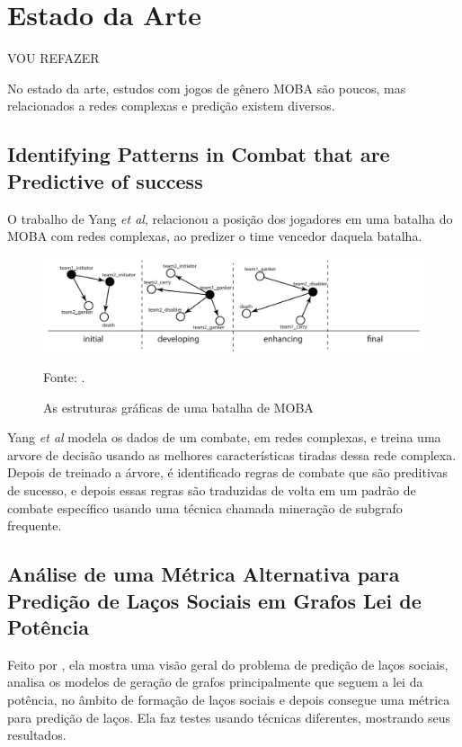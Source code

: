 \section{Estado da Arte}


{\Huge VOU REFAZER}


No estado da arte, estudos com jogos de gênero MOBA são poucos, mas relacionados a redes complexas e predição existem diversos.

\subsection{Identifying Patterns in Combat that are Predictive of success}
 O trabalho de Yang \textit{et al}, relacionou a posição dos jogadores em uma batalha do MOBA com redes complexas, ao predizer o time vencedor daquela batalha.

\begin{figure}[!ht]
	\caption{As estruturas gráficas de uma batalha de MOBA}
	\begin{center}
		\includegraphics[width=15cm]{imagens/yang.PNG}
	\end{center}
	\small{Fonte: \cite{Yang2014}.}
	\label{fig:yang2014}
\end{figure}

Yang \textit{et al} modela os dados de um combate, em redes complexas, e treina uma arvore de decisão usando as melhores características tiradas dessa rede complexa. Depois de treinado a árvore, é identificado regras de combate que são preditivas de sucesso, e depois essas regras são traduzidas de volta em um padrão de combate específico usando uma técnica chamada mineração de subgrafo frequente.

\subsection{Análise de uma Métrica Alternativa para Predição de Laços Sociais em Grafos Lei de Potência}

Feito por \citeauthor{Danielewicz2016}, ela mostra uma visão geral do problema de predição de laços sociais, analisa os modelos de geração de grafos principalmente que seguem a lei da potência, no âmbito de formação de laços sociais e depois consegue uma métrica para predição de laços. Ela faz testes usando técnicas diferentes, mostrando seus resultados.